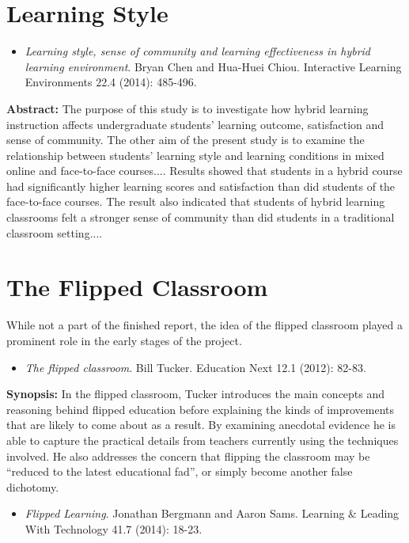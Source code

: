 \documentclass[12pt,a4paper,twoside]{report}
\begin{document}
\section{Learning Style}
\begin{itemize}
	\item \textit{Learning style, sense of community and learning effectiveness in hybrid learning environment}. Bryan Chen and Hua-Huei Chiou. Interactive Learning Environments 22.4 (2014): 485-496.
\end{itemize}

\noindent \textbf{Abstract:} The purpose of this study is to investigate how hybrid learning instruction affects undergraduate students’ learning outcome, satisfaction and sense of community. The other aim of the present study is to examine the relationship between students’ learning style and learning conditions in mixed online and face-to-face courses.... Results showed that students in a hybrid course had significantly higher learning scores and satisfaction than did students of the face-to-face courses. The result also indicated that students of hybrid learning classrooms felt a stronger sense of community than did students in a traditional classroom setting....

\section{The Flipped Classroom}
While not  a part of the finished report, the idea of the flipped classroom played a prominent role in the early stages of the project.

\begin{itemize}
	\item \textit{The flipped classroom}. Bill Tucker. Education Next 12.1 (2012): 82-83.
\end{itemize}

\noindent \textbf{Synopsis:} In the flipped classroom, Tucker introduces the main concepts and reasoning behind flipped education before explaining the kinds of improvements that are likely to come about as a result. By examining anecdotal evidence he is able to capture the practical details from teachers currently using the techniques involved. He also addresses the concern that flipping the classroom may be ``reduced to the latest educational fad'', or simply become another false dichotomy.

\begin{itemize}
	\item \textit{Flipped Learning}. Jonathan Bergmann and Aaron Sams. Learning \& Leading With Technology 41.7 (2014): 18-23.
\end{itemize}
\end{document}
